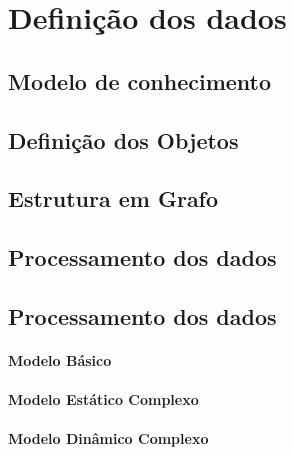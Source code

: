 \section{Definição dos dados}
\subsection{Modelo de conhecimento}
\subsection{Definição dos Objetos}
\subsection{Estrutura em Grafo}
\subsection{Processamento dos dados}
\subsection{Processamento dos dados}
\paragraph{Modelo Básico}
\paragraph{Modelo Estático Complexo}
\paragraph{Modelo Dinâmico Complexo}